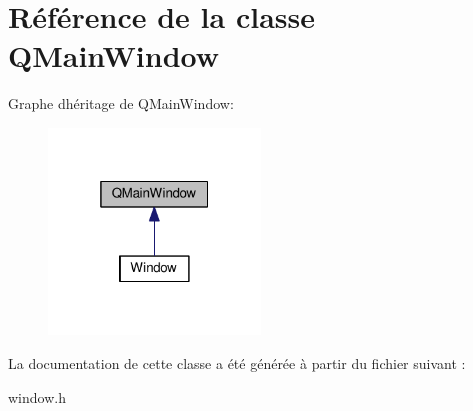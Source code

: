 \hypertarget{class_q_main_window}{}\section{Référence de la classe Q\+Main\+Window}
\label{class_q_main_window}


Graphe d\textquotesingle{}héritage de Q\+Main\+Window\+:\nopagebreak
\begin{figure}[H]
\begin{center}
\leavevmode
\includegraphics[width=160pt]{class_q_main_window__inherit__graph}
\end{center}
\end{figure}


La documentation de cette classe a été générée à partir du fichier suivant \+:\begin{DoxyCompactItemize}
\item 
window.\+h\end{DoxyCompactItemize}
